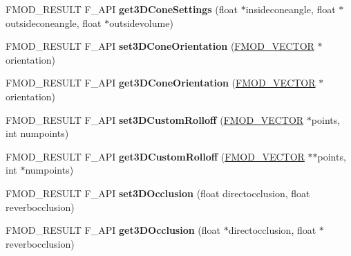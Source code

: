 \begin{DoxyCompactItemize}
\item 
F\+M\+O\+D\+\_\+\+R\+E\+S\+U\+LT F\+\_\+\+A\+PI {\bfseries get3\+D\+Cone\+Settings} (float $\ast$insideconeangle, float $\ast$outsideconeangle, float $\ast$outsidevolume)\hypertarget{class_f_m_o_d_1_1_channel_a7206e7b2353ed27ec91512690bd2c052}{}\label{class_f_m_o_d_1_1_channel_a7206e7b2353ed27ec91512690bd2c052}

\item 
F\+M\+O\+D\+\_\+\+R\+E\+S\+U\+LT F\+\_\+\+A\+PI {\bfseries set3\+D\+Cone\+Orientation} (\hyperlink{struct_f_m_o_d___v_e_c_t_o_r}{F\+M\+O\+D\+\_\+\+V\+E\+C\+T\+OR} $\ast$orientation)\hypertarget{class_f_m_o_d_1_1_channel_a6c10b3cdb50cb11d5090b14b7f569a79}{}\label{class_f_m_o_d_1_1_channel_a6c10b3cdb50cb11d5090b14b7f569a79}

\item 
F\+M\+O\+D\+\_\+\+R\+E\+S\+U\+LT F\+\_\+\+A\+PI {\bfseries get3\+D\+Cone\+Orientation} (\hyperlink{struct_f_m_o_d___v_e_c_t_o_r}{F\+M\+O\+D\+\_\+\+V\+E\+C\+T\+OR} $\ast$orientation)\hypertarget{class_f_m_o_d_1_1_channel_a0f22cabb2a93d1a8c038293c9a5a970d}{}\label{class_f_m_o_d_1_1_channel_a0f22cabb2a93d1a8c038293c9a5a970d}

\item 
F\+M\+O\+D\+\_\+\+R\+E\+S\+U\+LT F\+\_\+\+A\+PI {\bfseries set3\+D\+Custom\+Rolloff} (\hyperlink{struct_f_m_o_d___v_e_c_t_o_r}{F\+M\+O\+D\+\_\+\+V\+E\+C\+T\+OR} $\ast$points, int numpoints)\hypertarget{class_f_m_o_d_1_1_channel_a1ad33a178f33decfc764dfca2ad0aefb}{}\label{class_f_m_o_d_1_1_channel_a1ad33a178f33decfc764dfca2ad0aefb}

\item 
F\+M\+O\+D\+\_\+\+R\+E\+S\+U\+LT F\+\_\+\+A\+PI {\bfseries get3\+D\+Custom\+Rolloff} (\hyperlink{struct_f_m_o_d___v_e_c_t_o_r}{F\+M\+O\+D\+\_\+\+V\+E\+C\+T\+OR} $\ast$$\ast$points, int $\ast$numpoints)\hypertarget{class_f_m_o_d_1_1_channel_ae772d709160da9adb23971c6f0b2bc33}{}\label{class_f_m_o_d_1_1_channel_ae772d709160da9adb23971c6f0b2bc33}

\item 
F\+M\+O\+D\+\_\+\+R\+E\+S\+U\+LT F\+\_\+\+A\+PI {\bfseries set3\+D\+Occlusion} (float directocclusion, float reverbocclusion)\hypertarget{class_f_m_o_d_1_1_channel_a0037d4f48e07686f53d35c66fd6be5cd}{}\label{class_f_m_o_d_1_1_channel_a0037d4f48e07686f53d35c66fd6be5cd}

\item 
F\+M\+O\+D\+\_\+\+R\+E\+S\+U\+LT F\+\_\+\+A\+PI {\bfseries get3\+D\+Occlusion} (float $\ast$directocclusion, float $\ast$reverbocclusion)\hypertarget{class_f_m_o_d_1_1_channel_a0059b3132df76efd24f8567b4fcf4818}{}\label{class_f_m_o_d_1_1_channel_a0059b3132df76efd24f8567b4fcf4818}


\end{DoxyCompactItemize}
